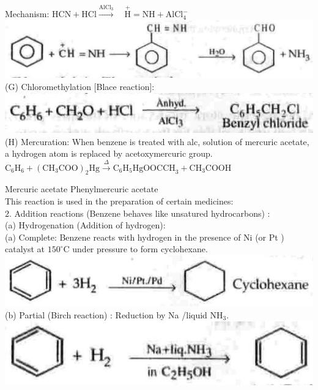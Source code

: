 \documentclass[10pt]{article}
\begin{document}
Mechanism: $\mathrm{HCN}+\mathrm{HCl} \xrightarrow{\mathrm{AlCl}_{3}} \quad \stackrel{+}{\mathrm{H}}=\mathrm{NH}+\mathrm{AlCl}_{4}^{-}$\\
\includegraphics[max width=\textwidth, center]{2025_01_28_8470952b98110cec3aabg-210(1)}\\[0pt]
(G) Chloromethylation [Blace reaction]:\\
\includegraphics[max width=\textwidth, center]{2025_01_28_8470952b98110cec3aabg-210(3)}\\
(H) Mercuration: When benzene is treated with alc, solution of mercuric acetate, a hydrogen atom is replaced by acetoxymercuric group. $\mathrm{C}_{6} \mathrm{H}_{6}+\left(\mathrm{CH}_{3} \mathrm{COO}\right)_{2} \mathrm{Hg} \xrightarrow{\Delta} \mathrm{C}_{6} \mathrm{H}_{5} \mathrm{HgOOCCH}_{3}+\mathrm{CH}_{3} \mathrm{COOH}$

Mercuric acetate Phenylmercuric acetate\\
This reaction is used in the preparation of certain medicines:\\
2. Addition reactions (Benzene behaves like unsatured hydrocarbons) :\\
(a) Hydrogenation (Addition of hydrogen):\\
(a) Complete: Benzene reacts with hydrogen in the presence of Ni (or Pt ) catalyst at $150^{\circ} \mathrm{C}$ under pressure to form cyclohexane.\\
\includegraphics[max width=\textwidth, center]{2025_01_28_8470952b98110cec3aabg-210(4)}\\
(b) Partial (Birch reaction) : Reduction by Na /liquid $\mathrm{NH}_{3}$.\\
\includegraphics[max width=\textwidth, center]{2025_01_28_8470952b98110cec3aabg-210(2)}
\end{document}
